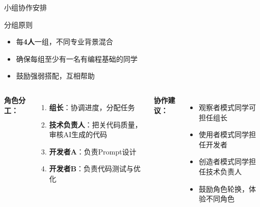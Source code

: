 \documentclass[aspectratio=169, 10pt]{beamer}
\begin{document}
\begin{frame}{小组协作安排}
	\begin{block}{分组原则}
		\begin{itemize}
			\item 每\textbf{4人}一组，不同专业背景混合
			\item 确保每组至少有一名有编程基础的同学
			\item 鼓励强弱搭配，互相帮助
		\end{itemize}
	\end{block}

	\vspace{0.3cm}

	\begin{columns}
		\textbf{角色分工：}
		\begin{enumerate}
			\item \textbf{组长}：协调进度，分配任务
			\item \textbf{技术负责人}：把关代码质量，审核AI生成的代码
			\item \textbf{开发者A}：负责Prompt设计
			\item \textbf{开发者B}：负责代码测试与优化
		\end{enumerate}

		\textbf{协作建议：}
		\begin{itemize}
			\item 观察者模式同学可担任组长
			\item 使用者模式同学担任开发者
			\item 创造者模式同学担任技术负责人
			\item 鼓励角色轮换，体验不同角色
		\end{itemize}
	\end{columns}
\end{frame}
\end{document}
